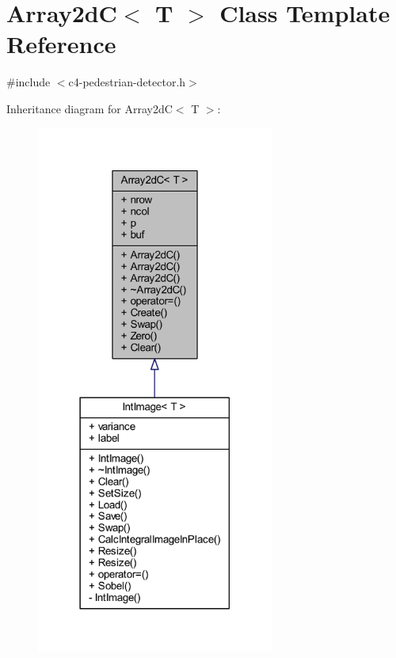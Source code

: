 \hypertarget{class_array2d_c}{}\section{Array2dC$<$ T $>$ Class Template Reference}
\label{class_array2d_c}


{\ttfamily \#include $<$c4-\/pedestrian-\/detector.\+h$>$}



Inheritance diagram for Array2dC$<$ T $>$\+:\nopagebreak
\begin{figure}[H]
\begin{center}
\leavevmode
\includegraphics[width=221pt]{class_array2d_c__inherit__graph}
\end{center}
\end{figure}


